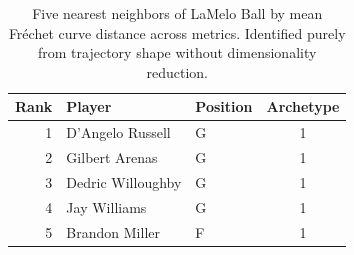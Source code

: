 \begin{table}[htbp]
  \centering\small
  \begin{tabular}{rllc}
    \toprule
    Rank & Player & Position & Archetype \\
    \midrule
    1 & D'Angelo Russell & G & 1 \\
    2 & Gilbert Arenas & G & 1 \\
    3 & Dedric Willoughby & G & 1 \\
    4 & Jay Williams & G & 1 \\
    5 & Brandon Miller & F & 1 \\
    \bottomrule
  \end{tabular}
  \caption{Five nearest neighbors of LaMelo Ball by mean Fr\'{e}chet curve distance across metrics. Identified purely from trajectory shape without dimensionality reduction.}
  \label{tab:LaMelo_Ball_frechet_curve_neighbors}
\end{table}

